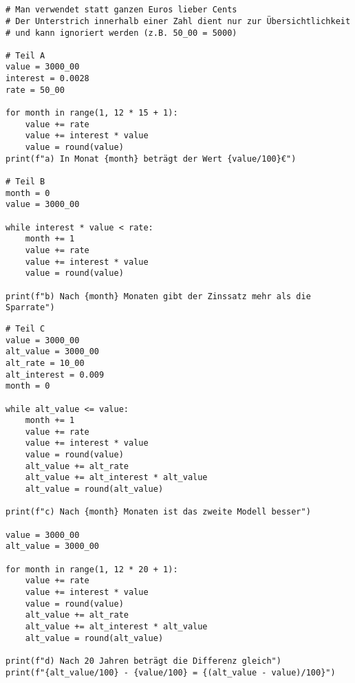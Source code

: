 \documentclass[a4paper]{article}
\begin{document}
\section{}
\begin{verbatim}
# Man verwendet statt ganzen Euros lieber Cents
# Der Unterstrich innerhalb einer Zahl dient nur zur Übersichtlichkeit
# und kann ignoriert werden (z.B. 50_00 = 5000)

# Teil A
value = 3000_00
interest = 0.0028
rate = 50_00

for month in range(1, 12 * 15 + 1):
    value += rate
    value += interest * value
    value = round(value)
print(f"a) In Monat {month} beträgt der Wert {value/100}€")

# Teil B
month = 0
value = 3000_00

while interest * value < rate:
    month += 1
    value += rate
    value += interest * value
    value = round(value)

print(f"b) Nach {month} Monaten gibt der Zinssatz mehr als die Sparrate")
\end{verbatim}
\newpage
\begin{verbatim}
# Teil C
value = 3000_00
alt_value = 3000_00
alt_rate = 10_00
alt_interest = 0.009
month = 0

while alt_value <= value:
    month += 1
    value += rate
    value += interest * value
    value = round(value)
    alt_value += alt_rate
    alt_value += alt_interest * alt_value
    alt_value = round(alt_value)

print(f"c) Nach {month} Monaten ist das zweite Modell besser")

value = 3000_00
alt_value = 3000_00

for month in range(1, 12 * 20 + 1):
    value += rate
    value += interest * value
    value = round(value)
    alt_value += alt_rate
    alt_value += alt_interest * alt_value
    alt_value = round(alt_value)

print(f"d) Nach 20 Jahren beträgt die Differenz gleich")
print(f"{alt_value/100} - {value/100} = {(alt_value - value)/100}")
\end{verbatim}

\newpage
\end{document}
